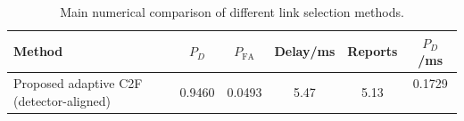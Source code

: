 \begin{table}[t]
    \centering
    \caption{Main numerical comparison of different link selection methods.}
    \label{tab:main_summary}
    \begin{tabular}{l c c c c c}
        \hline
        Method & $P_D$ & $P_{\mathrm{FA}}$ & Delay/ms & Reports & $P_D$/ms \\
        \hline
        Proposed adaptive C2F (detector-aligned) & 0.9460 & 0.0493 & 5.47 & 5.13 & 0.1729 \
        \hline
    \end{tabular}
\end{table}
